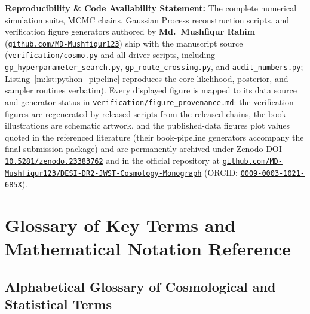 \documentclass[aps,prd,preprint,superscriptaddress,nofootinbib]{revtex4-2}
\begin{document}
\vspace{6pt}
\noindent\textbf{Reproducibility \& Code Availability Statement:} The complete numerical simulation suite, MCMC chains, Gaussian Process reconstruction scripts, and verification figure generators authored by \textbf{Md.\ Mushfiqur Rahim} (\href{https://github.com/MD-Mushfiqur123}{\texttt{github.com/MD-Mushfiqur123}}) ship with the manuscript source (\texttt{verification/cosmo.py} and all driver scripts, including \texttt{gp\_hyperparameter\_search.py}, \texttt{gp\_route\_crossing.py}, and \texttt{audit\_numbers.py}; Listing~\ref{m:lst:python_pipeline} reproduces the core likelihood, posterior, and sampler routines verbatim). Every displayed figure is mapped to its data source and generator status in \texttt{verification/figure\_provenance.md}: the verification figures are regenerated by released scripts from the released chains, the book illustrations are schematic artwork, and the published-data figures plot values quoted in the referenced literature (their book-pipeline generators accompany the final submission package) and are permanently archived under Zenodo DOI \href{https://doi.org/10.5281/zenodo.23383762}{\texttt{10.5281/zenodo.23383762}} and in the official repository at \href{https://github.com/MD-Mushfiqur123/DESI-DR2-JWST-Cosmology-Monograph}{\texttt{github.com/MD-Mushfiqur123/DESI-DR2-JWST-Cosmology-Monograph}} (ORCID: \href{https://orcid.org/0009-0003-1021-685X}{\texttt{0009-0003-1021-685X}}).


\section{Glossary of Key Terms and Mathematical Notation Reference}

\subsection{Alphabetical Glossary of Cosmological and Statistical Terms}
\end{document}
